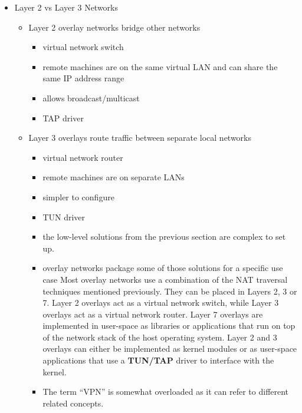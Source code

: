\begin{itemize}
\tightlist
\item
  Layer 2 vs Layer 3 Networks

  \begin{itemize}
  \tightlist
  \item
    Layer 2 overlay networks bridge other networks

    \begin{itemize}
    \tightlist
    \item
      virtual network switch
    \item
      remote machines are on the same virtual LAN and can share the same
      IP address range
    \item
      allows broadcast/multicast
    \item
      TAP driver
    \end{itemize}
  \item
    Layer 3 overlays route traffic between separate local networks

    \begin{itemize}
    \item
      virtual network router
    \item
      remote machines are on separate LANs
    \item
      simpler to configure
    \item
      TUN driver
    \item
      the low-level solutions from the previous section are complex to
      set up.
    \item
      overlay networks package some of those solutions for a specific
      use case Most overlay networks use a combination of the NAT
      traversal techniques mentioned previously. They can be placed in
      Layers 2, 3 or 7. Layer 2 overlays act as a virtual network
      switch, while Layer 3 overlays act as a virtual network router.
      Layer 7 overlays are implemented in user-space as libraries or
      applications that run on top of the network stack of the host
      operating system. Layer 2 and 3 overlays can either be implemented
      as kernel modules or as user-space applications that use a
      \textbf{TUN/TAP}  driver to interface with
      the kernel.
    \end{itemize}


    \begin{itemize}
    \tightlist
    \item
      The term ``VPN'' is somewhat overloaded as it can refer to
      different related concepts.
    \end{itemize}


\end{itemize}
\end{itemize}
